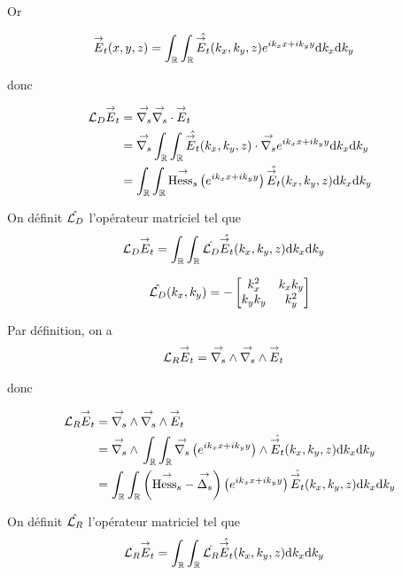    Or 

    \begin{align}
      \vE_t(x,y,z) & = \int_\RR\int_\RR \hat{\vE_t}(k_x,k_y,z)e^{ik_xx + ik_yy}\dd{k_x}\dd{k_y}
    \end{align}


    donc

    \begin{align}
      \LD \vE_t 
      & = \vgrads{} \vdivs{} \vE_t 
      \\
      &=\vgrads{} \int_\RR\int_\RR \hat{\vE_t}(k_x,k_y,z) \cdot \vgrads{} e^{ik_xx + ik_yy}\dd{k_x}\dd{k_y}
      \\
      &=\int_\RR\int_\RR  \vhesss{}\left( e^{ik_xx + ik_yy} \right) \hat{\vE_t}(k_x,k_y,z)\dd{k_x}\dd{k_y}
    \end{align}

    On définit \(\hat{\LD}\) l'opérateur matriciel tel que
    \begin{align}
      \LD \vE_t 
      &= \int_\RR\int_\RR \hat{\LD} \hat{\vE_t}(k_x,k_y,z)\dd{k_x}\dd{k_y}
    \end{align}

    \begin{equation}
      \hat{\LD}(k_x,k_y) = -
      \begin{bmatrix}
        k_x^2 & k_x k_y 
        \\
        k_y k_y & k_y^2
      \end{bmatrix}
    \end{equation}


    Par définition, on a 
    \begin{align}
      \LR \vE_t & = \vrots{} \vrots{} \vE_t
    \end{align}

    donc

    \begin{align}
      \LR \vE_t 
      & = \vrots{} \vrots{} \vE_t 
      \\
      &=\vrots{} \int_\RR\int_\RR \vgrads{}\left(e^{ik_xx + ik_yy}\right) \pvect \hat{\vE_t}(k_x,k_y,z)\dd{k_x}\dd{k_y}
      \\
      &= \int_\RR\int_\RR \left(\vhesss - \vlapls\right) \left(e^{ik_xx + ik_yy}\right) \hat{\vE_t}(k_x,k_y,z)\dd{k_x}\dd{k_y}
      \\
    \end{align}

    On définit \(\hat{\LR}\) l'opérateur matriciel tel que
    \begin{align}
      \LR \vE_t 
      &= \int_\RR\int_\RR \hat{\LR} \hat{\vE_t}(k_x,k_y,z)\dd{k_x}\dd{k_y}
    \end{align}

